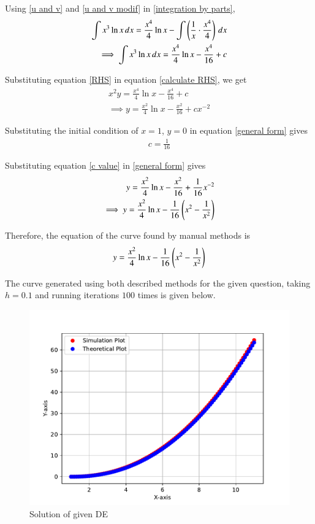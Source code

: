 \documentclass[journal]{IEEEtran}
\begin{document}
Using \eqref{u and v} and \eqref{u and v modif} in \eqref{integration by parts},
\begin{align}
\int x^3\ln{x} \,dx = \frac{x^4}{4}\ln{x} - \int \left(\frac{1}{x}\cdot\frac{x^4}{4}\right) \,dx  \\
\implies \int x^3\ln{x} \,dx = \frac{x^4}{4}\ln{x} - \frac{x^4}{16} + c \label{RHS}
\end{align}

Substituting equation \eqref{RHS} in equation \eqref{calculate RHS}, we get
\begin{align}
x^2y = \frac{x^4}{4}\ln{x} - \frac{x^4}{16} + c \\
\implies y = \frac{x^2}{4}\ln{x} - \frac{x^2}{16} + cx^{-2} \label{general form}
\end{align}

Substituting the initial condition of $x=1$, $y=0$ in equation \eqref{general form} gives
\begin{align}
c = \frac{1}{16} \label{c value}
\end{align}

Substituting equation \eqref{c value} in \eqref{general form} gives
\begin{align}
y = \frac{x^2}{4}\ln{x} - \frac{x^2}{16} + \frac{1}{16}x^{-2} \\
\implies y = \frac{x^2}{4}\ln{x} - \frac{1}{16}\left(x^2 - \frac{1}{x^2}\right)
\end{align}

Therefore, the equation of the curve found by manual methods is
\begin{align}
y = \frac{x^2}{4}\ln{x} - \frac{1}{16}\left(x^2 - \frac{1}{x^2}\right)
\end{align}

\newpage

The curve generated using both described methods for the given question, taking $h=0.1$ and running iterations $100$ times is given below.

\begin{figure}[h]
	\centering
	\includegraphics[width=\columnwidth]{figs/fig.pdf}
	\caption{Solution of given DE}
	\label{fig}
\end{figure}
\end{document}
